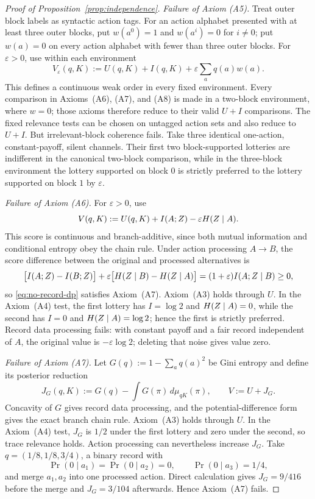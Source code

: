 \begin{proof}[Proof of Proposition~\ref{prop:independence}]
\emph{Failure of Axiom \textup{(A5)}.}
Treat outer block labels as syntactic action tags.  For an action alphabet presented with at least three outer
blocks, put $w(a^0)=1$ and $w(a^i)=0$ for $i\ne0$; put $w(a)=0$ on every action alphabet with fewer than three
outer blocks.  For $\varepsilon>0$, use within each environment
\[
 V_\varepsilon(q,K):=U(q,K)+I(q,K)+\varepsilon\sum_aq(a)w(a).
\]
This defines a continuous weak order in every fixed environment.  Every comparison in Axioms~\textup{(A6)},
\textup{(A7)}, and \textup{(A8)} is made in a two-block environment, where $w=0$; those axioms therefore reduce
to their valid $U+I$ comparisons.  The fixed relevance tests can be chosen on untagged action sets and also reduce
to $U+I$.  But irrelevant-block coherence fails.  Take three identical one-action, constant-payoff, silent
channels.  Their first two block-supported lotteries are indifferent in the canonical two-block comparison, while
in the three-block environment the lottery supported on block $0$ is strictly preferred to the lottery supported
on block $1$ by $\varepsilon$.

\emph{Failure of Axiom \textup{(A6)}.}
For $\varepsilon>0$, use
\begin{equation}
 V(q,K):=U(q,K)+I(A;Z)-\varepsilon H(Z\mid A).
 \label{eq:no-record-dp}
\end{equation}
This score is continuous and branch-additive, since both mutual information and conditional entropy obey the chain
rule.  Under action processing $A\to B$, the score difference between the original and processed alternatives is
\[
 \bigl[I(A;Z)-I(B;Z)\bigr]
 +\varepsilon\bigl[H(Z\mid B)-H(Z\mid A)\bigr]
 =(1+\varepsilon)I(A;Z\mid B)\ge0,
\]
so \eqref{eq:no-record-dp} satisfies Axiom~\textup{(A7)}.  Axiom~\textup{(A3)} holds through $U$.  In the
Axiom~\textup{(A4)} test, the first lottery has $I=\log2$ and $H(Z\mid A)=0$, while the second has
$I=0$ and $H(Z\mid A)=\log2$; hence the first is strictly preferred.  Record data
processing fails: with constant payoff and a fair record independent of $A$, the original value is $-\varepsilon\log2$;
deleting that noise gives value zero.

\emph{Failure of Axiom \textup{(A7)}.}
Let $G(q):=1-\sum_aq(a)^2$ be Gini entropy and define its posterior reduction
\[
 J_G(q,K):=G(q)-\int G(\pi)\,d\mu_{qK}(\pi),
 \qquad V:=U+J_G.
\]
Concavity of $G$ gives record data processing, and the potential-difference form gives the exact branch chain rule.
Axiom~\textup{(A3)} holds through $U$.  In the Axiom~\textup{(A4)} test, $J_G$ is $1/2$ under the first
lottery and zero under the second, so trace relevance holds.  Action processing can nevertheless increase $J_G$.  Take
$q=(1/8,1/8,3/4)$, a binary record with
\[
 \Pr(0\mid a_1)=\Pr(0\mid a_2)=0,
 \qquad \Pr(0\mid a_3)=1/4,
\]
and merge $a_1,a_2$ into one processed action.  Direct calculation gives $J_G=9/416$ before the merge and
$J_G=3/104$ afterwards.  Hence Axiom~\textup{(A7)} fails.


\end{proof}
